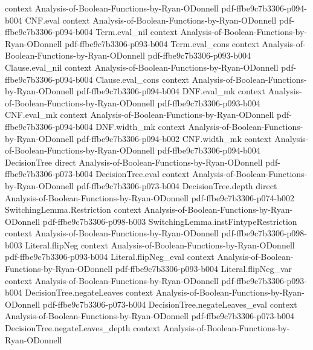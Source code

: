 \begin{theorem}
  {context}
  {Analysis-of-Boolean-Functions-by-Ryan-ODonnell}
  {pdf-ffbe9c7b3306-p094-b004}
\proofstep
  {CNF.eval}
  {context}
  {Analysis-of-Boolean-Functions-by-Ryan-ODonnell}
  {pdf-ffbe9c7b3306-p094-b004}
\proofstep
  {Term.eval_nil}
  {context}
  {Analysis-of-Boolean-Functions-by-Ryan-ODonnell}
  {pdf-ffbe9c7b3306-p093-b004}
\proofstep
  {Term.eval_cons}
  {context}
  {Analysis-of-Boolean-Functions-by-Ryan-ODonnell}
  {pdf-ffbe9c7b3306-p093-b004}
\proofstep
  {Clause.eval_nil}
  {context}
  {Analysis-of-Boolean-Functions-by-Ryan-ODonnell}
  {pdf-ffbe9c7b3306-p094-b004}
\proofstep
  {Clause.eval_cons}
  {context}
  {Analysis-of-Boolean-Functions-by-Ryan-ODonnell}
  {pdf-ffbe9c7b3306-p094-b004}
\proofstep
  {DNF.eval_mk}
  {context}
  {Analysis-of-Boolean-Functions-by-Ryan-ODonnell}
  {pdf-ffbe9c7b3306-p093-b004}
\proofstep
  {CNF.eval_mk}
  {context}
  {Analysis-of-Boolean-Functions-by-Ryan-ODonnell}
  {pdf-ffbe9c7b3306-p094-b004}
\proofstep
  {DNF.width_mk}
  {context}
  {Analysis-of-Boolean-Functions-by-Ryan-ODonnell}
  {pdf-ffbe9c7b3306-p094-b002}
\proofstep
  {CNF.width_mk}
  {context}
  {Analysis-of-Boolean-Functions-by-Ryan-ODonnell}
  {pdf-ffbe9c7b3306-p094-b004}
\proofstep
  {DecisionTree}
  {direct}
  {Analysis-of-Boolean-Functions-by-Ryan-ODonnell}
  {pdf-ffbe9c7b3306-p073-b004}
\proofstep
  {DecisionTree.eval}
  {context}
  {Analysis-of-Boolean-Functions-by-Ryan-ODonnell}
  {pdf-ffbe9c7b3306-p073-b004}
\proofstep
  {DecisionTree.depth}
  {direct}
  {Analysis-of-Boolean-Functions-by-Ryan-ODonnell}
  {pdf-ffbe9c7b3306-p074-b002}
\proofstep
  {SwitchingLemma.Restriction}
  {context}
  {Analysis-of-Boolean-Functions-by-Ryan-ODonnell}
  {pdf-ffbe9c7b3306-p098-b003}
\proofstep
  {SwitchingLemma.instFintypeRestriction}
  {context}
  {Analysis-of-Boolean-Functions-by-Ryan-ODonnell}
  {pdf-ffbe9c7b3306-p098-b003}
\proofstep
  {Literal.flipNeg}
  {context}
  {Analysis-of-Boolean-Functions-by-Ryan-ODonnell}
  {pdf-ffbe9c7b3306-p093-b004}
\proofstep
  {Literal.flipNeg_eval}
  {context}
  {Analysis-of-Boolean-Functions-by-Ryan-ODonnell}
  {pdf-ffbe9c7b3306-p093-b004}
\proofstep
  {Literal.flipNeg_var}
  {context}
  {Analysis-of-Boolean-Functions-by-Ryan-ODonnell}
  {pdf-ffbe9c7b3306-p093-b004}
\proofstep
  {DecisionTree.negateLeaves}
  {context}
  {Analysis-of-Boolean-Functions-by-Ryan-ODonnell}
  {pdf-ffbe9c7b3306-p073-b004}
\proofstep
  {DecisionTree.negateLeaves_eval}
  {context}
  {Analysis-of-Boolean-Functions-by-Ryan-ODonnell}
  {pdf-ffbe9c7b3306-p073-b004}
\proofstep
  {DecisionTree.negateLeaves_depth}
  {context}
  {Analysis-of-Boolean-Functions-by-Ryan-ODonnell}

\end{theorem}
